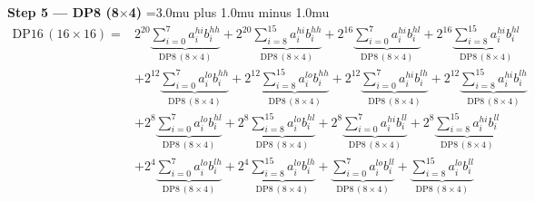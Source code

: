 \documentclass[fleqn]{article}
\newcommand{\DPop}[3]{\mathrm{DP#1}\,(#2\!\times\!#3)}
\begin{document}
\textbf{Step 5 --- DP8 (8$\times$4)}
{\medmuskip=3.0mu plus 1.0mu minus 1.0mu
\begin{align*}
\DPop{16}{16}{16} = {}
  & 2^{20} \underbrace{\sum_{i=0}^{7} a_i^{hi} b_i^{hh}}_{\DPop{8}{8}{4}}
  + 2^{20} \underbrace{\sum_{i=8}^{15} a_i^{hi} b_i^{hh}}_{\DPop{8}{8}{4}}
  + 2^{16} \underbrace{\sum_{i=0}^{7} a_i^{hi} b_i^{hl}}_{\DPop{8}{8}{4}}
  + 2^{16} \underbrace{\sum_{i=8}^{15} a_i^{hi} b_i^{hl}}_{\DPop{8}{8}{4}} \\[1em]
  & + 2^{12} \underbrace{\sum_{i=0}^{7} a_i^{lo} b_i^{hh}}_{\DPop{8}{8}{4}}
  + 2^{12} \underbrace{\sum_{i=8}^{15} a_i^{lo} b_i^{hh}}_{\DPop{8}{8}{4}}
  + 2^{12} \underbrace{\sum_{i=0}^{7} a_i^{hi} b_i^{lh}}_{\DPop{8}{8}{4}}
  + 2^{12} \underbrace{\sum_{i=8}^{15} a_i^{hi} b_i^{lh}}_{\DPop{8}{8}{4}} \\[1em]
  & + 2^{8} \underbrace{\sum_{i=0}^{7} a_i^{lo} b_i^{hl}}_{\DPop{8}{8}{4}}
  + 2^{8} \underbrace{\sum_{i=8}^{15} a_i^{lo} b_i^{hl}}_{\DPop{8}{8}{4}}
  + 2^{8} \underbrace{\sum_{i=0}^{7} a_i^{hi} b_i^{ll}}_{\DPop{8}{8}{4}}
  + 2^{8} \underbrace{\sum_{i=8}^{15} a_i^{hi} b_i^{ll}}_{\DPop{8}{8}{4}} \\[1em]
  & + 2^{4} \underbrace{\sum_{i=0}^{7} a_i^{lo} b_i^{lh}}_{\DPop{8}{8}{4}}
  + 2^{4} \underbrace{\sum_{i=8}^{15} a_i^{lo} b_i^{lh}}_{\DPop{8}{8}{4}}
  + \underbrace{\sum_{i=0}^{7} a_i^{lo} b_i^{ll}}_{\DPop{8}{8}{4}}
  + \underbrace{\sum_{i=8}^{15} a_i^{lo} b_i^{ll}}_{\DPop{8}{8}{4}}
\end{align*}
}
\end{document}
